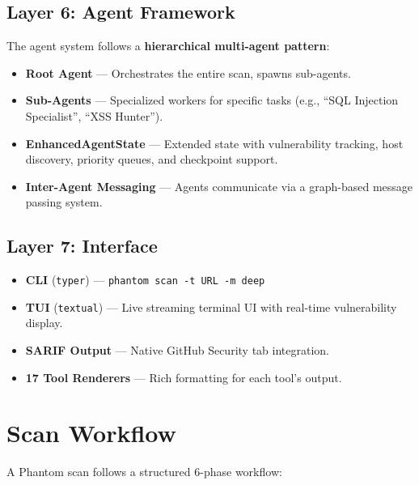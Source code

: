 \documentclass[12pt,a4paper]{article}
\begin{document}
\subsection{Layer 6: Agent Framework}

The agent system follows a \textbf{hierarchical multi-agent pattern}:

\begin{itemize}
    \item \textbf{Root Agent} — Orchestrates the entire scan, spawns sub-agents.
    \item \textbf{Sub-Agents} — Specialized workers for specific tasks
          (e.g., ``SQL Injection Specialist'', ``XSS Hunter'').
    \item \textbf{EnhancedAgentState} — Extended state with vulnerability tracking,
          host discovery, priority queues, and checkpoint support.
    \item \textbf{Inter-Agent Messaging} — Agents communicate via a graph-based
          message passing system.
\end{itemize}

\subsection{Layer 7: Interface}

\begin{itemize}
    \item \textbf{CLI} (\texttt{typer}) — \texttt{phantom scan -t URL -m deep}
    \item \textbf{TUI} (\texttt{textual}) — Live streaming terminal UI with
          real-time vulnerability display.
    \item \textbf{SARIF Output} — Native GitHub Security tab integration.
    \item \textbf{17 Tool Renderers} — Rich formatting for each tool's output.
\end{itemize}

\section{Scan Workflow}

A Phantom scan follows a structured 6-phase workflow:
\end{document}
